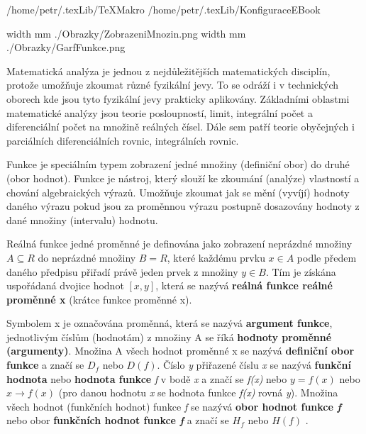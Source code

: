 \def\addr{/home/petr/.texLib/}

 \addr TeXMakro
\setAddress{\addr}
 \addr KonfiguraceEBook


\pdfximage width \the\SirkaOdstavce mm {./Obrazky/ZobrazeniMnozin.png}
\pdfximage width \the\SirkaOdstavce mm {./Obrazky/GarfFunkce.png}

 

\Obsah


Matematická analýza je jednou z nejdůležitějších matematických disciplín, protože umožňuje zkoumat různé fyzikální jevy. To se odráží i v technických oborech kde jsou tyto fyzikální jevy prakticky aplikovány. 
Základními oblastmi matematické analýzy jsou teorie posloupností, limit, integrální počet a diferenciální počet na množině reálných čísel. Dále sem patří teorie obyčejných i parciálních diferenciálních rovnic, integrálních rovnic.


Funkce je speciálním typem zobrazení jedné množiny (definiční obor) do druhé (obor hodnot). Funkce je nástroj, který slouží ke zkoumání (analýze) vlastností a chování algebraických výrazů. Umožňuje zkoumat jak se mění (vyvíjí) hodnoty daného výrazu pokud jsou za proměnnou výrazu postupně dosazovány hodnoty z dané množiny (intervalu) hodnotu.

Reálná funkce jedné proměnné je definována jako zobrazení neprázdné množiny $ A \subseteq R $ do neprázdné množiny $ B = R $, které každému prvku $ x \in A $ podle předem daného předpisu přiřadí právě jeden prvek z množiny $y \in B $. Tím je získána uspořádaná dvojice hodnot $ [ x,y]$, která se nazývá {\bf reálná funkce reálné proměnné x } (krátce funkce proměnné x).

\vskip 4mm
\centerline{}
\vskip 4mm

Symbolem x je označována proměnná, která se nazývá {\bf argument funkce}, jednotlivým číslům (hodnotám) z množiny A se říká {\bf hodnoty proměnné (argumenty)}. Množina A všech hodnot proměnné x se nazývá {\bf definiční obor funkce} a značí se $D_f $ nebo $ D(f) $. Číslo {\it y} přiřazené číslu {\it x} se nazývá {\bf funkční hodnota} nebo {\bf hodnota funkce} {\it f} v bodě {\it x } a značí se {\it f(x)} nebo $ y=f(x) $ nebo $x \rightarrow f(x)$ (pro danou hodnotu {\it x} se hodnota funkce {\it f(x)} rovná {\it y}). Množina všech  hodnot (funkčních hodnot) funkce {\it f} se nazývá {\bf obor hodnot funkce {\it f}} nebo obor {\bf funkčních hodnot funkce {\it f}} a značí se $ H_f $ nebo $H(f)$ .

